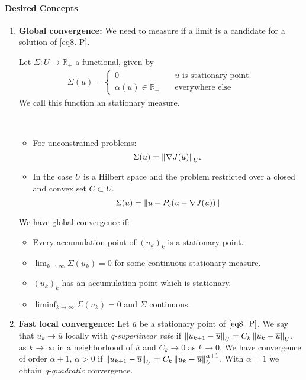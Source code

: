 \paragraph{Desired Concepts}
\begin{enumerate}
	\item \textbf{Global convergence: }We need to measure if a limit is a candidate for a solution of \eqref{eq8. P}.
	\begin{definition}
		Let $\Sigma: U\rightarrow \mathbb{R}_+$ a functional, given by
		\begin{align*}
		\Sigma(u)=
		\left\lbrace	
		\begin{array}{ll}
			0 & \quad u \text{ is stationary point}.\\
			\alpha(u) \in \mathbb{R}_+ & \quad \text{everywhere else}			
			\end{array}
		\right.
		\end{align*}
	We call this function an stationary measure. 
	\end{definition}
	\begin{example}\
	\begin{itemize}
		\item For unconstrained problems: \[\Sigma(u)=\left\lVert\nabla J(u)\right\rVert_{U^*}\]
		\item In the case $U$ is a Hilbert space and the problem restricted over a closed and convex set $C\subset U$. 
		\[
		\Sigma(u)= \left\lVert u-P_c(u-\nabla J(u))\right\rVert
		\]
	\end{itemize}
	\end{example}
	We have global convergence if:
	\begin{itemize}
		\item Every accumulation point of $(u_k)_k$ is a stationary point.
		\item $\lim_{k\rightarrow \infty} \Sigma(u_k)=0$ for some continuous stationary measure.
		\item $(u_k)_k$ has an accumulation point which is stationary.
		\item $\liminf_{k\rightarrow\infty} \Sigma(u_k) =0$ and $\Sigma$ continuous.
	\end{itemize}
	\item \textbf{Fast local convergence:}
	Let $\overline{u}$ be a stationary point of $\eqref{eq8. P}$. We say that $u_k \rightarrow \overline{u}$ locally with \textit{q-superlinear rate} if $\left\lVert u_{k+1}-\overline{u}\right\rVert_U=C_k\left\lVert u_k-\overline{u}\right\rVert_U$, as $k\rightarrow \infty$ in a neighborhood of $\overline{u}$ and $C_k\rightarrow 0$ as $k\rightarrow 0$.
	We have convergence of order $\alpha +1$, $\alpha >0$ if 
	$\left\lVert u_{k+1}-\overline{u}\right\rVert_U=C_k\left\lVert u_k-\overline{u}\right\rVert^{\alpha+1}_U$. With $\alpha =1$ we obtain \textit{q-quadratic} convergence.
\end{enumerate}


